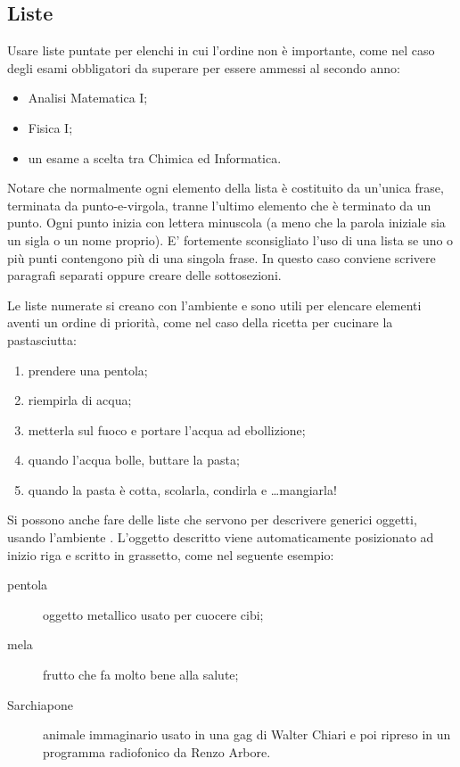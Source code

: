 
\subsection{Liste}

Usare liste puntate per elenchi in cui l'ordine non è importante, come nel caso degli esami obbligatori da superare per essere ammessi al secondo anno:
\begin{itemize}
\item
Analisi Matematica I;
\item
Fisica I;
\item
un esame a scelta tra Chimica ed Informatica.
\end{itemize}
Notare che normalmente ogni elemento della lista è costituito da un'unica frase, terminata da punto-e-virgola, tranne l'ultimo elemento che è terminato da un punto. Ogni punto inizia con lettera minuscola (a meno che la parola iniziale sia un sigla o un nome proprio). E' fortemente sconsigliato l'uso di una lista se uno o più punti contengono più di una singola frase. In questo caso conviene scrivere paragrafi separati oppure creare delle sottosezioni.

Le liste numerate si creano con l'ambiente  e sono utili per elencare elementi aventi un ordine di priorità, come nel caso della ricetta per cucinare la pastasciutta:
\begin{enumerate}
\item
prendere una pentola;
\item
riempirla di acqua;
\item
metterla sul fuoco e portare l'acqua ad ebollizione;
\item
quando l'acqua bolle, buttare la pasta;
\item
quando la pasta è cotta, scolarla, condirla e \ldots mangiarla!
\end{enumerate}
Si possono anche fare delle liste che servono per descrivere generici oggetti, usando l'ambiente .
L'oggetto descritto viene automaticamente posizionato ad inizio riga e scritto in grassetto, come nel seguente esempio:
\begin{description}
\item[pentola]
oggetto metallico usato per cuocere cibi;
\item[mela]
frutto che fa molto bene alla salute;
\item[Sarchiapone] animale immaginario usato in una gag di Walter Chiari e poi ripreso in un programma radiofonico da Renzo Arbore.
\end{description}

